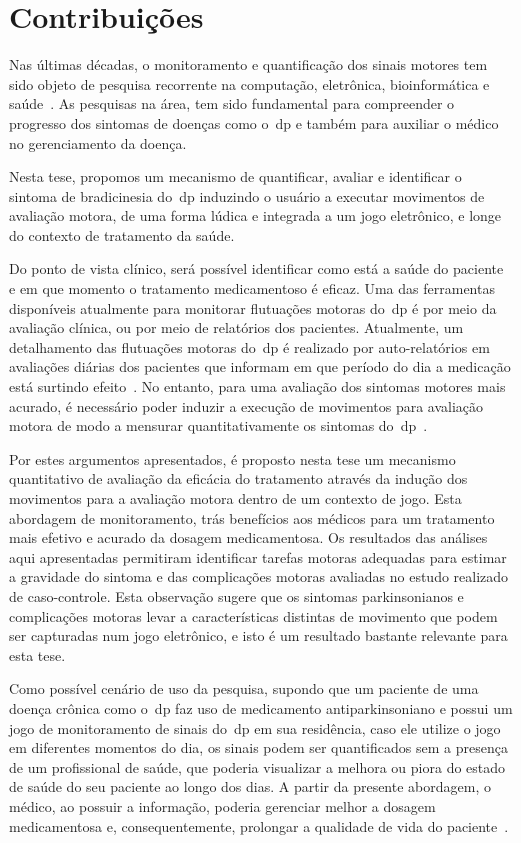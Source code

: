 \section{Contribuições}
Nas últimas décadas, o monitoramento e quantificação dos sinais motores tem sido objeto de pesquisa recorrente na computação, eletrônica, bioinformática e saúde~\cite{reviewassesenspark2015}. As pesquisas na área, tem sido fundamental para compreender o progresso dos sintomas de doenças como o~\ac{dp} e também para auxiliar o médico no gerenciamento da doença.

Nesta tese, propomos um mecanismo de quantificar, avaliar e identificar o sintoma de bradicinesia do~\ac{dp} induzindo o usuário a executar movimentos de avaliação motora, de uma forma lúdica e integrada a um jogo eletrônico, e longe do contexto de tratamento da saúde.

Do ponto de vista clínico, será possível identificar como está a saúde do paciente e em que momento o tratamento medicamentoso é eficaz. Uma das ferramentas disponíveis atualmente para monitorar flutuações motoras do~\ac{dp} é por meio da avaliação clínica, ou por meio de relatórios dos pacientes. Atualmente, um detalhamento das flutuações motoras do~\ac{dp} é realizado por auto-relatórios em avaliações diárias dos pacientes que informam em que período do dia a medicação está surtindo efeito~\cite{reviewassesenspark2015}. No entanto, para uma avaliação dos sintomas motores mais acurado, é necessário poder induzir a execução de movimentos para avaliação motora de modo a mensurar quantitativamente os sintomas do~\ac{dp}~\cite{wiiassesspark2016}.

Por estes argumentos apresentados, é proposto nesta tese um mecanismo quantitativo de avaliação da eficácia do tratamento através da indução dos movimentos para a avaliação motora dentro de um contexto de jogo. Esta abordagem de monitoramento, trás benefícios aos médicos para um tratamento mais efetivo e acurado da dosagem medicamentosa. Os resultados das análises aqui apresentadas permitiram identificar tarefas motoras adequadas para estimar a gravidade do sintoma e das complicações motoras avaliadas no estudo realizado de caso-controle. Esta observação sugere que os sintomas parkinsonianos e complicações motoras levar a características distintas de movimento que podem ser capturadas num jogo eletrônico, e isto é um resultado bastante relevante para esta tese.

Como possível cenário de uso da pesquisa, supondo que um paciente de uma doença crônica como o~\ac{dp} faz uso de medicamento antiparkinsoniano e possui um jogo de monitoramento de sinais do~\ac{dp} em sua residência, caso ele utilize o jogo em diferentes momentos do dia, os sinais podem ser quantificados sem a presença de um profissional de saúde, que poderia visualizar a melhora ou piora do estado de saúde do seu paciente ao longo dos dias. A partir da presente abordagem, o médico, ao possuir a informação, poderia gerenciar melhor a dosagem medicamentosa e, consequentemente, prolongar a qualidade de vida do paciente~\cite{abn2010}.

